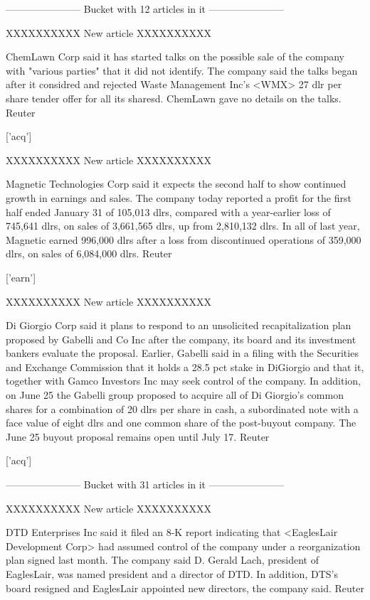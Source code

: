\documentclass{article}
\begin{document}
\begin{pythonOutput}
-----------------------
Bucket with 12 articles in it
-----------------------


XXXXXXXXXX
New article
XXXXXXXXXX

ChemLawn Corp said it has
started talks on the possible sale of the company with "various
parties" that it did not identify.
    The company said the talks began after it considred and
rejected Waste Management Inc's <WMX> 27 dlr per share tender
offer for all its sharesd.
    ChemLawn gave no details on the talks.
 Reuter

['acq']

XXXXXXXXXX
New article
XXXXXXXXXX

Magnetic Technologies Corp said
it expects the second half to show continued growth in earnings
and sales.
    The company today reported a profit for the first half
ended January 31 of 105,013 dlrs, compared with a year-earlier
loss of 745,641 dlrs, on sales of 3,661,565 dlrs, up from
2,810,132 dlrs.  In all of last year, Magnetic earned 996,000
dlrs after a loss from discontinued operations of 359,000 dlrs,
on sales of 6,084,000 dlrs.
 Reuter

['earn']

XXXXXXXXXX
New article
XXXXXXXXXX

Di Giorgio Corp said it plans to
respond to an unsolicited recapitalization plan proposed by
Gabelli and Co Inc after the company, its board and its
investment bankers evaluate the proposal.
    Earlier, Gabelli said in a filing with the Securities and
Exchange Commission that it holds a 28.5 pct stake in DiGiorgio
and that it, together with Gamco Investors Inc may seek control
of the company.
    In addition, on June 25 the Gabelli group proposed to
acquire all of Di Giorgio's common shares for a combination of
20 dlrs per share in cash, a subordinated note with a face
value of eight dlrs and one common share of the post-buyout
company.
    The June 25 buyout proposal remains open until July 17.
 Reuter

['acq']

-----------------------
Bucket with 31 articles in it
-----------------------


XXXXXXXXXX
New article
XXXXXXXXXX

DTD Enterprises Inc said it filed an
8-K report indicating that <EaglesLair Development Corp> had
assumed control of the company under a reorganization plan
signed last month.
    The company said D. Gerald Lach, president of EaglesLair,
was named president and a director of DTD.
    In addition, DTS's board resigned and EaglesLair appointed
new directors, the company said.
 Reuter


\end{pythonOutput}
\end{document}
